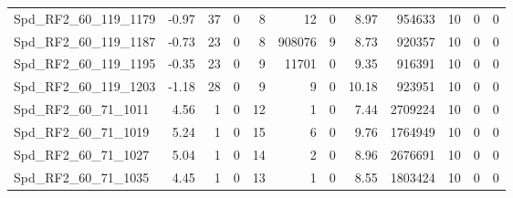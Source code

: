 \begin{longtable}[c]{@{}lrrrrrrrrrrr@{}}
Spd\_RF2\_60\_119\_1179       & -0.97                  & 37                      & 0                       & 8                      & 12                      & 0                       & 8.97                    & 954633                   & 10                       & 0                        & 0                        \\
Spd\_RF2\_60\_119\_1187       & -0.73                  & 23                      & 0                       & 8                      & 908076                  & 9                       & 8.73                    & 920357                   & 10                       & 0                        & 0                        \\
Spd\_RF2\_60\_119\_1195       & -0.35                  & 23                      & 0                       & 9                      & 11701                   & 0                       & 9.35                    & 916391                   & 10                       & 0                        & 0                        \\
Spd\_RF2\_60\_119\_1203       & -1.18                  & 28                      & 0                       & 9                      & 9                       & 0                       & 10.18                   & 923951                   & 10                       & 0                        & 0                        \\
Spd\_RF2\_60\_71\_1011        & 4.56                   & 1                       & 0                       & 12                     & 1                       & 0                       & 7.44                    & 2709224                  & 10                       & 0                        & 0                        \\
Spd\_RF2\_60\_71\_1019        & 5.24                   & 1                       & 0                       & 15                     & 6                       & 0                       & 9.76                    & 1764949                  & 10                       & 0                        & 0                        \\
Spd\_RF2\_60\_71\_1027        & 5.04                   & 1                       & 0                       & 14                     & 2                       & 0                       & 8.96                    & 2676691                  & 10                       & 0                        & 0                        \\
Spd\_RF2\_60\_71\_1035        & 4.45                   & 1                       & 0                       & 13                     & 1                       & 0                       & 8.55                    & 1803424                  & 10                       & 0                        & 0                        \\

\end{longtable}
